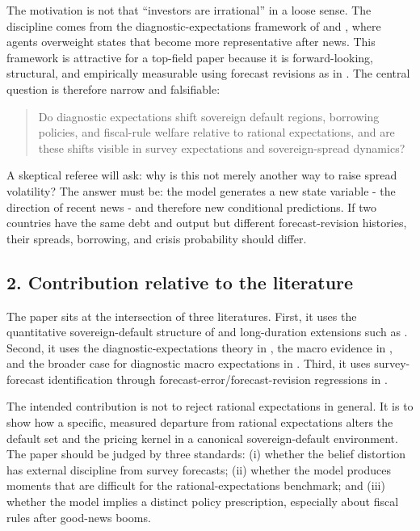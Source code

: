 \documentclass[11pt]{article}
\begin{document}
The motivation is not that ``investors are irrational'' in a loose sense. The discipline comes from the diagnostic-expectations framework of \citet{BordaloGennaioliShleifer2018} and \citet{BordaloGennaioliMaShleifer2020}, where agents overweight states that become more representative after news. This framework is attractive for a top-field paper because it is forward-looking, structural, and empirically measurable using forecast revisions as in \citet{CoibionGorodnichenko2015}. The central question is therefore narrow and falsifiable:
\begin{quote}
Do diagnostic expectations shift sovereign default regions, borrowing policies, and fiscal-rule welfare relative to rational expectations, and are these shifts visible in survey expectations and sovereign-spread dynamics?
\end{quote}

A skeptical referee will ask: why is this not merely another way to raise spread volatility? The answer must be: the model generates a new state variable - the direction of recent news - and therefore new conditional predictions. If two countries have the same debt and output but different forecast-revision histories, their spreads, borrowing, and crisis probability should differ.

\subsection*{2. Contribution relative to the literature}
The paper sits at the intersection of three literatures. First, it uses the quantitative sovereign-default structure of \citet{Arellano2008} and long-duration extensions such as \citet{ChatterjeeEyigungor2012}. Second, it uses the diagnostic-expectations theory in \citet{BordaloGennaioliShleifer2018}, the macro evidence in \citet{BordaloGennaioliMaShleifer2020}, and the broader case for diagnostic macro expectations in \citet{BordaloEtAl2022JEP}. Third, it uses survey-forecast identification through forecast-error/forecast-revision regressions in \citet{CoibionGorodnichenko2015}.

The intended contribution is not to reject rational expectations in general. It is to show how a specific, measured departure from rational expectations alters the default set and the pricing kernel in a canonical sovereign-default environment. The paper should be judged by three standards: (i) whether the belief distortion has external discipline from survey forecasts; (ii) whether the model produces moments that are difficult for the rational-expectations benchmark; and (iii) whether the model implies a distinct policy prescription, especially about fiscal rules after good-news booms.
\end{document}
